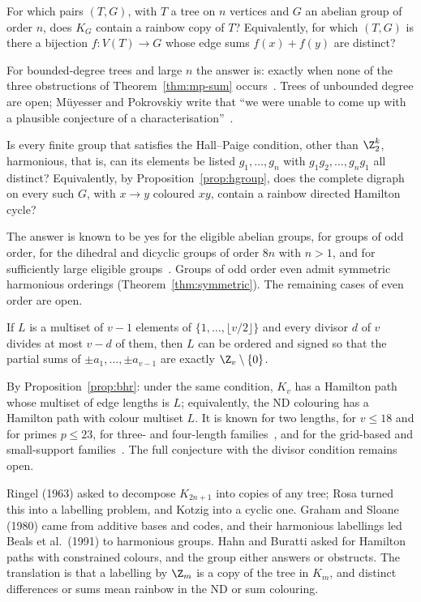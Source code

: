 \begin{problem}\label{prob:sum-trees}
For which pairs $(T,G)$, with $T$ a tree on $n$ vertices and $G$ an abelian group of order $n$, does $K_G$ contain a rainbow copy of $T$? Equivalently, for which $(T,G)$ is there a bijection $f\colon V(T)\to G$ whose edge sums $f(x)+f(y)$ are distinct?
\end{problem}

For bounded-degree trees and large $n$ the answer is: exactly when none of the three obstructions of Theorem~\ref{thm:mp-sum} occurs~\cite[Theorem~1.5]{mp25b}. Trees of unbounded degree are open; M\"uyesser and Pokrovskiy write that ``we were unable to come up with a plausible conjecture of a characterisation''~\cite[\S1]{mp25b}.

\begin{problem}\label{prob:harmonious-groups}
Is every finite group that satisfies the Hall--Paige condition, other than $\Z_2^k$, harmonious, that is, can its elements be listed $g_1,\dots,g_n$ with $g_1g_2,\dots,g_ng_1$ all distinct? Equivalently, by Proposition~\ref{prop:hgroup}, does the complete digraph on every such $G$, with $x\to y$ coloured $xy$, contain a rainbow directed Hamilton cycle?
\end{problem}

The answer is known to be yes for the eligible abelian groups, for groups of odd order, for the dihedral and dicyclic groups of order $8n$ with $n>1$, and for sufficiently large eligible groups~\cite{mp22}. Groups of odd order even admit symmetric harmonious orderings (Theorem~\ref{thm:symmetric}). The remaining cases of even order are open.

\begin{conjecture}\label{conj:bhr-open}
If $L$ is a multiset of $v-1$ elements of $\{1,\dots,\lfloor v/2\rfloor\}$ and every divisor $d$ of $v$ divides at most $v-d$ of them, then $L$ can be ordered and signed so that the partial sums of $\pm a_1,\dots,\pm a_{v-1}$ are exactly $\Z_v\setminus\{0\}$.
\end{conjecture}

By Proposition~\ref{prop:bhr}: under the same condition, $K_v$ has a Hamilton path whose multiset of edge lengths is $L$; equivalently, the ND colouring has a Hamilton path with colour multiset $L$. It is known for two lengths, for $v\leq18$ and for primes $p\leq23$, for three- and four-length families~\cite{opps20}, and for the grid-based and small-support families~\cite{ao24,ao25}. The full conjecture with the divisor condition remains open.


Ringel (1963) asked to decompose $K_{2n+1}$ into copies of any tree; Rosa turned this into a labelling problem, and Kotzig into a cyclic one. Graham and Sloane (1980) came from additive bases and codes, and their harmonious labellings led Beals et al.\ (1991) to harmonious groups. Hahn and Buratti asked for Hamilton paths with constrained colours, and the group either answers or obstructs. The translation is that a labelling by $\Z_m$ is a copy of the tree in $K_m$, and distinct differences or sums mean rainbow in the ND or sum colouring.
